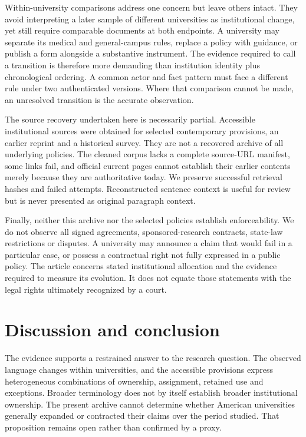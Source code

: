 \documentclass[12pt]{article}
\begin{document}
Within-university comparisons address one concern but leave others intact. They avoid interpreting a later sample of different universities as institutional change, yet still require comparable documents at both endpoints. A university may separate its medical and general-campus rules, replace a policy with guidance, or publish a form alongside a substantive instrument. The evidence required to call a transition is therefore more demanding than institution identity plus chronological ordering. A common actor and fact pattern must face a different rule under two authenticated versions. Where that comparison cannot be made, an unresolved transition is the accurate observation.

The source recovery undertaken here is necessarily partial. Accessible institutional sources were obtained for selected contemporary provisions, an earlier reprint and a historical survey. They are not a recovered archive of all underlying policies. The cleaned corpus lacks a complete source-URL manifest, some links fail, and official current pages cannot establish their earlier contents merely because they are authoritative today. We preserve successful retrieval hashes and failed attempts. Reconstructed sentence context is useful for review but is never presented as original paragraph context.

Finally, neither this archive nor the selected policies establish enforceability. We do not observe all signed agreements, sponsored-research contracts, state-law restrictions or disputes. A university may announce a claim that would fail in a particular case, or possess a contractual right not fully expressed in a public policy. The article concerns stated institutional allocation and the evidence required to measure its evolution. It does not equate those statements with the legal rights ultimately recognized by a court.

\section{Discussion and conclusion}
The evidence supports a restrained answer to the research question. The observed language changes within universities, and the accessible provisions express heterogeneous combinations of ownership, assignment, retained use and exceptions. Broader terminology does not by itself establish broader institutional ownership. The present archive cannot determine whether American universities generally expanded or contracted their claims over the period studied. That proposition remains open rather than confirmed by a proxy.
\end{document}
